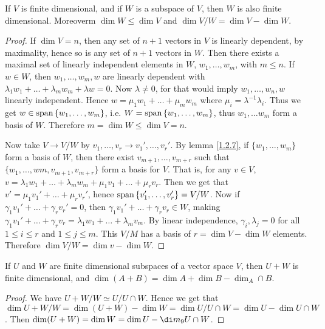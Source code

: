 \begin{lemma}\label{1.2.8}
    If $V$ is finite dimensional, and if  $W$ is a subspace of  $V$, then  $W$
    is also finite dimensional. Moreoverm  $\dim{W} \leq \dim{V}$ and
    $\dim{V/W}=\dim{V}-\dim{W}$.
\end{lemma}
\begin{proof}
    If $\dim{V}=n$, then any set of $n+1$ vectors in $V$ is linearly dependent, by
    maximality, hence so is any  set of $n+1$ vectors in  $W$. Then there
    exists a maximal set of linearly independent elements in $W$,  $ w_1, \dots,
    w_m$, with $m \leq n$. If  $w \in W$, then  $ w_1, \dots, w_m,w$ are
    linearly dependent with $\lambda_1w_1+\dots+\lambda_mw_m+\lambda w=0$. Now
    $\lambda \neq 0$, for that would imply $ w_1, \dots, w_n, w$ linearly
    independent. Hence $w=\mu_1w_1+\dots+\mu_mw_m$ where
    $\mu_i=\lambda^{-1}\lambda_i$. Thus we get $w \in \operatorname{span}{\{w_1, \dots,
    w_m\}}$, i.e. $W=\operatorname{span}{\{w_1, \dots, w_m\}}$, thus $ w_1, \dots w_m$ form a
    basis of $W$. Therefore  $m=\dim{W} \leq \dim{V}=n$.

    Now take $V \rightarrow V/W$ by $ v_1, \dots, v_r \rightarrow v_1', \dots,
    v_r'$. By lemma \ref{1.2.7}, if $\{w_1, \dots, w_m\}$ form a basis of $W$,
    then there exist  $v_{m+1}, \dots, v_{m+r}$ such that $\{w_1, \dots,
    wm,v_{m+1}, v_{m+r}\}$ form a basis for $V$. That is, for any  $v \in V$,
    $v=\lambda_1w_1+\dots+\lambda_mw_m+\mu_1v_1+\dots+\mu_rv_r$. Then we get
    that $v'=\mu_1v_1'+\dots+\mu_rv_r'$, hence $\operatorname{span}{\{v_1', \dots,
    v_r'\}}=V/W$. Now if $\gamma_1v_1'+\dots+\gamma_rv_r'=0$, then
    $\gamma_1v_1'+\dots+\gamma_rv_r \in W$, making
    $\gamma_1v_1'+\dots+\gamma_rv_r=\lambda_1w_1+\dots+\lambda_mv_m$. By linear
    independence, $\gamma_i, \lambda_j=0$ for all  $1 \leq i \leq r$ and  $1
    \leq j \leq m$. This  $V/M$ has a basis of $r=\dim{V}-\dim{W}$ elements.
    Therefore $\dim{V/W}=\dim{v}-\dim{W}$.
\end{proof}
\begin{corollary}
    If $U$ and  $W$ are finite dimensional subspaces of a vector space  $V$,
    then  $U+W$ is finite dimensional, and  $\dim(A+B)=\dim{A}+\dim{B}-\dim_A
    \cap B$.
\end{corollary}
\begin{proof}
    We have $U+W/W \simeq U/U \cap W$. Hence we get that
    $\dim{U+W/W}=\dim{(U+W)}-\dim{W}=\dim{U/U \cap W}=\dim{U}-\dim{U \cap W}$.
    Then $\dim(U+W)=\dim{W}=\dim{U}-\di m_9U \cap W$.
\end{proof}

